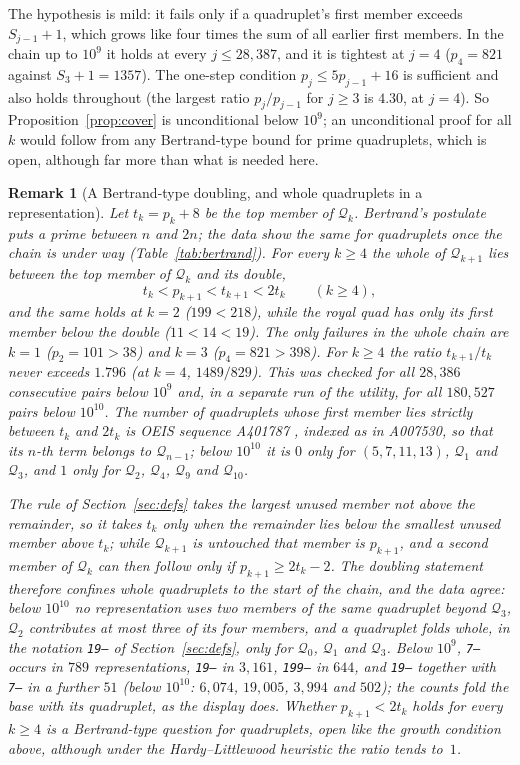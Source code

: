 \documentclass[11pt,a4paper]{article}
\newtheorem{remark}{Remark}
\newcommand{\Q}{\mathcal{Q}}
\newcommand{\code}[1]{\texttt{#1}}
\begin{document}
The hypothesis is mild: it fails only if a quadruplet's first member
exceeds $S_{j-1}+1$, which grows like four times the sum of all earlier
first members. In the chain up to $10^9$ it holds at every $j\le 28{,}387$,
and it is tightest at $j=4$ ($p_4=821$ against $S_3+1=1357$). The one-step
condition $p_j\le 5p_{j-1}+16$ is sufficient and also holds throughout
(the largest ratio $p_j/p_{j-1}$ for $j\ge3$ is $4.30$, at $j=4$). So
Proposition~\ref{prop:cover} is unconditional below $10^9$; an
unconditional proof for all $k$ would follow from any Bertrand-type bound
for prime quadruplets, which is open, although far more than what is
needed here.

\begin{remark}[A Bertrand-type doubling, and whole quadruplets in a representation]
\label{rem:doubling}
Let $t_k=p_k+8$ be the top member of $\Q_k$. Bertrand's postulate puts a
prime between $n$ and $2n$; the data show the same for quadruplets once
the chain is under way (Table~\ref{tab:bertrand}). For every $k\ge4$ the whole of $\Q_{k+1}$ lies
between the top member of $\Q_k$ and its double,
\[
  t_k<p_{k+1}<t_{k+1}<2t_k\qquad(k\ge4),
\]
and the same holds at $k=2$ ($199<218$), while the royal quad has only
its first member below the double ($11<14<19$). The only failures in the
whole chain are $k=1$ ($p_2=101>38$) and $k=3$ ($p_4=821>398$). For
$k\ge4$ the ratio $t_{k+1}/t_k$ never exceeds $1.796$ (at $k=4$,
$1489/829$). This was checked for all $28{,}386$ consecutive pairs below
$10^9$ and, in a separate run of the utility, for all $180{,}527$ pairs
below $10^{10}$. The number of quadruplets whose first member lies
strictly between $t_k$ and $2t_k$ is OEIS sequence A401787
\cite{OEIS_A401787}, indexed as in A007530, so that its $n$-th term
belongs to $\Q_{n-1}$; below $10^{10}$ it is $0$ only for $(5,7,11,13)$,
$\Q_1$ and $\Q_3$, and $1$ only for $\Q_2$, $\Q_4$, $\Q_9$ and
$\Q_{10}$.

The rule of Section~\ref{sec:defs} takes the largest unused member not
above the remainder, so it takes $t_k$ only when the remainder lies below
the smallest unused member above $t_k$; while $\Q_{k+1}$ is untouched that
member is $p_{k+1}$, and a second member of $\Q_k$ can then follow only if
$p_{k+1}\ge 2t_k-2$. The doubling statement therefore confines whole
quadruplets to the start of the chain, and the data agree: below
$10^{10}$ no representation uses two members of the same quadruplet
beyond $\Q_3$, $\Q_2$ contributes at most three of its four members, and
a quadruplet folds whole, in the notation \code{19--} of
Section~\ref{sec:defs}, only for $\Q_0$, $\Q_1$ and $\Q_3$. Below $10^9$,
\code{7--} occurs in $789$ representations, \code{19--} in $3{,}161$,
\code{199--} in $644$, and \code{19--} together with \code{7--} in a
further $51$ (below $10^{10}$: $6{,}074$, $19{,}005$, $3{,}994$ and
$502$); the counts fold the base with its quadruplet, as the display does.
Whether $p_{k+1}<2t_k$ holds for every $k\ge4$ is a Bertrand-type
question for quadruplets, open like the growth condition above, although
under the Hardy--Littlewood heuristic the ratio tends to~$1$.
\end{remark}
\end{document}
